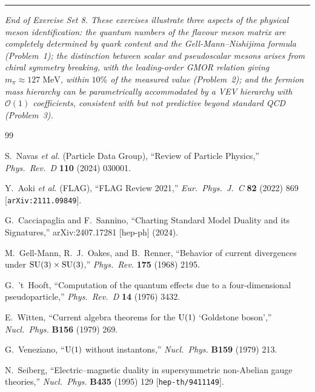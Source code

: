 \documentclass[11pt,a4paper]{article}
\begin{document}
\bigskip

\begin{center}
\rule{0.6\textwidth}{0.4pt}

\textit{End of Exercise Set 8.  These exercises illustrate three
aspects of the physical meson identification: the quantum numbers of
the flavour meson matrix are completely determined by quark content
and the Gell-Mann--Nishijima formula (Problem~1); the distinction
between scalar and pseudoscalar mesons arises from chiral symmetry
breaking, with the leading-order GMOR relation giving
$m_\pi \approx 127\;\text{MeV}$, within $10\%$ of the measured value
(Problem~2); and the fermion mass
hierarchy can be parametrically accommodated by a VEV hierarchy with
$\mathcal{O}(1)$ coefficients, consistent with but not predictive
beyond standard QCD (Problem~3).}
\end{center}


\begin{thebibliography}{99}

  S.~Navas \textit{et al.} (Particle Data Group),
  ``Review of Particle Physics,''
  \textit{Phys.\ Rev.\ D} \textbf{110} (2024) 030001.

  Y.~Aoki \textit{et al.} (FLAG),
  ``FLAG Review 2021,''
  \textit{Eur.\ Phys.\ J.\ C} \textbf{82} (2022) 869
  [\texttt{arXiv:2111.09849}].

  G.~Cacciapaglia and F.~Sannino,
  ``Charting Standard Model Duality and its Signatures,''
  arXiv:2407.17281 [hep-ph] (2024).

  M.~Gell-Mann, R.~J.~Oakes, and B.~Renner,
  ``Behavior of current divergences under $\mathrm{SU}(3) \times \mathrm{SU}(3)$,''
  \textit{Phys.\ Rev.} \textbf{175} (1968) 2195.

  G.~'t~Hooft,
  ``Computation of the quantum effects due to a four-dimensional
  pseudoparticle,''
  \textit{Phys.\ Rev.\ D} \textbf{14} (1976) 3432.

  E.~Witten,
  ``Current algebra theorems for the $\mathrm{U}(1)$ `Goldstone boson',''
  \textit{Nucl.\ Phys.} \textbf{B156} (1979) 269.

  G.~Veneziano,
  ``$\mathrm{U}(1)$ without instantons,''
  \textit{Nucl.\ Phys.} \textbf{B159} (1979) 213.

  N.~Seiberg,
  ``Electric--magnetic duality in supersymmetric non-Abelian gauge
  theories,''
  \textit{Nucl.\ Phys.} \textbf{B435} (1995) 129
  [\texttt{hep-th/9411149}].

\end{thebibliography}
\end{document}
